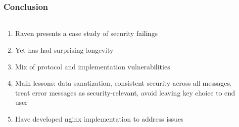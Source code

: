 \documentclass[handout, aspectratio=169, notes=hide]{beamer}
\begin{document}

\begin{frame}
\frametitle{Conclusion}
\framesubtitle{}
\setlength{\parskip}{1.0em}
\begin{columns}[T]
\begin{column}[T]{1.0\textwidth}	
\setlength{\parskip}{1.0em}

\begin{enumerate}
\setlength{\parskip}{1.0em}
\item Raven presents a case study of security failings
\item Yet has had surprising longevity
\item Mix of protocol and implementation vulnerabilities
\item Main lessons: data sanatization, consistent security across all messages, treat error messages as security-relevant, avoid leaving key choice to end user
\item Have developed nginx implementation to address issues
\end{enumerate}
\end{column}

\begin{column}[T]{0.0\textwidth}
\end{column}
\end{columns}

\end{frame}
\note{
}



\end{document}
